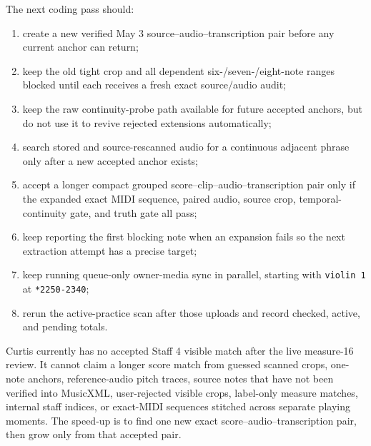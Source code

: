 The next coding pass should:
\begin{enumerate}
    \item create a new verified May 3 source--audio--transcription pair before any current anchor can return;
    \item keep the old tight crop and all dependent six-/seven-/eight-note ranges blocked until each receives a fresh exact source/audio audit;
    \item keep the raw continuity-probe path available for future accepted anchors, but do not use it to revive rejected extensions automatically;
    \item search stored and source-rescanned audio for a continuous adjacent phrase only after a new accepted anchor exists;
    \item accept a longer compact grouped score--clip--audio--transcription pair only if the expanded exact MIDI sequence, paired audio, source crop, temporal-continuity gate, and truth gate all pass;
    \item keep reporting the first blocking note when an expansion fails so the next extraction attempt has a precise target;
    \item keep running queue-only owner-media sync in parallel, starting with \texttt{violin 1} at \texttt{*2250-2340};
    \item rerun the active-practice scan after those uploads and record checked, active, and pending totals.
\end{enumerate}

Curtis currently has no accepted Staff 4 visible match after the live measure-16 review. It cannot claim a longer score match from guessed scanned crops, one-note anchors, reference-audio pitch traces, source notes that have not been verified into MusicXML, user-rejected visible crops, label-only measure matches, internal staff indices, or exact-MIDI sequences stitched across separate playing moments. The speed-up is to find one new exact score--audio--transcription pair, then grow only from that accepted pair.
